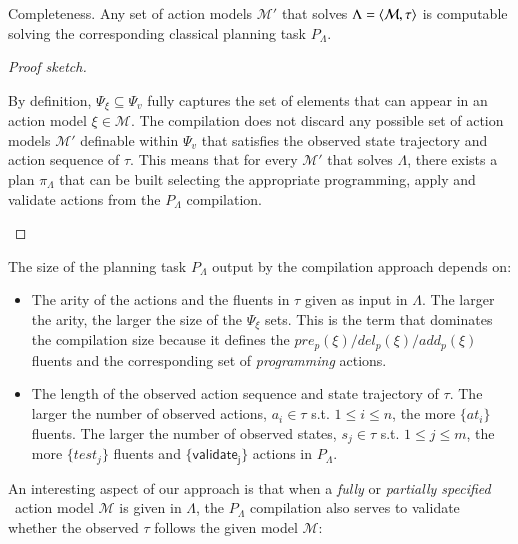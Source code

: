 \begin{mylemma}
Completeness. Any set of action models $\mathcal{M}'$ that solves $\Lambda={\langle \mathcal{M},\tau \rangle}$ is computable solving the corresponding classical planning task $P_{\Lambda}$.
\end{mylemma}

\begin{proof}[Proof sketch]
\begin{small}
  By definition, $\Psi_{\xi}\subseteq \Psi_v$ fully captures the set of elements that can appear in an action model $\xi\in\mathcal{M}$. The compilation does not discard any possible set of action models $\mathcal{M}'$ definable within $\Psi_v$ that satisfies the observed state trajectory and action sequence of $\tau$. This means that for every $\mathcal{M}'$ that solves $\Lambda$, there exists a plan $\pi_\Lambda$ that can be built selecting the appropriate programming, apply and validate actions from the $P_{\Lambda}$ compilation.
\end{small}
\end{proof}

The size of the planning task $P_{\Lambda}$ output by the compilation approach depends on:

\begin{itemize}
\item The arity of the actions and the fluents in $\tau$ given as input in $\Lambda$. The larger the arity, the larger the size of the $\Psi_{\xi}$ sets. This is the term that dominates the compilation size because it defines the $pre_p(\xi)/del_p(\xi)/add_p(\xi)$ fluents and the corresponding set of {\em programming} actions.
\item The length of the observed action sequence and state trajectory of $\tau$. The larger the number of observed actions, $a_i\in\tau$ s.t. $1\leq i\leq n$, the more $\{at_i\}$ fluents. The larger the number of observed states, $s_j\in\tau$ s.t. $1\leq j\leq m$, the more $\{test_j\}$ fluents and $\{\mathsf{validate_{j}}\}$ actions in $P_{\Lambda}$.
\end{itemize}

An interesting aspect of our approach is that when a {\em fully} or {\em partially specified} \strips\ action model $\mathcal{M}$ is given in $\Lambda$, the $P_{\Lambda}$ compilation also serves to validate whether the observed $\tau$ follows the given model $\mathcal{M}$:

